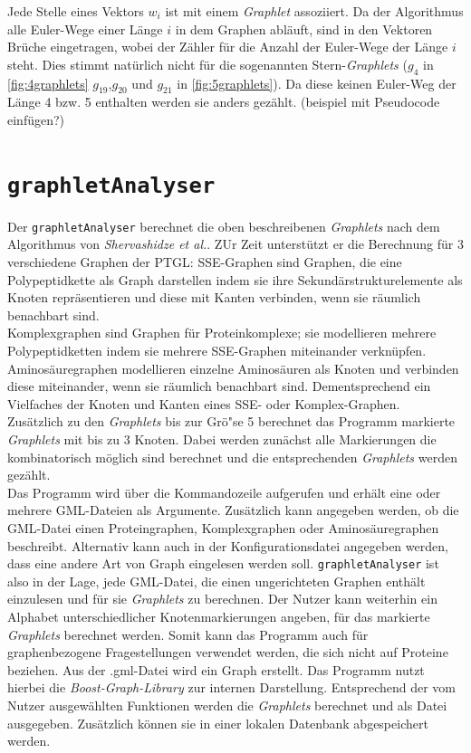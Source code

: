 \documentclass{report}
\begin{document}
Jede Stelle eines Vektors $w_i$ ist mit einem \textit{Graphlet} assoziiert. Da der Algorithmus alle Euler-Wege einer L\"ange $i$ in dem Graphen abl\"auft, sind in den Vektoren Br\"uche eingetragen, wobei der Z\"ahler f\"ur die Anzahl der Euler-Wege der L\"ange $i$ steht. Dies stimmt nat\"urlich nicht f\"ur die sogenannten Stern-\textit{Graphlets} ($g_4$ in \ref{fig:4graphlets} $g_{19}$,$g_{20}$ und $g_{21}$ in \ref{fig:5graphlets}). Da diese keinen Euler-Weg der L\"ange 4 bzw. 5 enthalten werden sie anders gez\"ahlt.
(beispiel mit Pseudocode einf\"ugen?)


\section{\texttt{graphletAnalyser}}

Der \texttt{graphletAnalyser} berechnet die oben beschreibenen \textit{Graphlets} nach dem Algorithmus von \emph{Shervashidze et al.}. ZUr Zeit unterst\"utzt er die Berechnung f\"ur 3 verschiedene Graphen der PTGL: 
SSE-Graphen sind Graphen, die eine Polypeptidkette als Graph darstellen indem sie ihre Sekund\"arstrukturelemente als Knoten repr\"asentieren und diese mit Kanten verbinden, wenn sie r\"aumlich benachbart sind. \\
Komplexgraphen sind Graphen f\"ur Proteinkomplexe; sie modellieren mehrere Polypeptidketten indem sie mehrere SSE-Graphen miteinander verkn\"upfen. \\
Aminos\"auregraphen modellieren einzelne Aminos\"auren als Knoten und verbinden diese miteinander, wenn sie r\"aumlich benachbart sind. Dementsprechend ein Vielfaches der Knoten und Kanten eines SSE- oder Komplex-Graphen. \\
Zus\"atzlich zu den \textit{Graphlets} bis zur Gr\"o"se 5 berechnet das Programm markierte \textit{Graphlets} mit bis zu 3 Knoten. Dabei werden zun\"achst alle Markierungen die kombinatorisch m\"oglich sind berechnet und die entsprechenden \textit{Graphlets} werden gez\"ahlt.\\
Das Programm wird \"uber die Kommandozeile aufgerufen und erh\"alt eine oder mehrere GML-Dateien als Argumente.
Zus\"atzlich kann angegeben werden, ob die GML-Datei einen Proteingraphen, Komplexgraphen oder Aminos\"auregraphen beschreibt.
Alternativ kann auch in der Konfigurationsdatei angegeben werden, dass eine andere Art von Graph eingelesen werden soll.
\texttt{graphletAnalyser} ist also in der Lage, jede GML-Datei, die einen ungerichteten Graphen enth\"alt einzulesen und f\"ur sie \textit{Graphlets} zu berechnen. Der Nutzer kann weiterhin ein Alphabet unterschiedlicher Knotenmarkierungen angeben, f\"ur das markierte \textit{Graphlets} berechnet werden. Somit kann das Programm auch f\"ur graphenbezogene Fragestellungen verwendet werden, die sich nicht auf Proteine beziehen.
Aus der .gml-Datei wird ein Graph erstellt. Das Programm nutzt hierbei die \textit{Boost-Graph-Library} zur internen Darstellung. Entsprechend der vom Nutzer ausgew\"ahlten Funktionen werden die \textit{Graphlets} berechnet und als Datei ausgegeben. Zus\"atzlich k\"onnen sie in einer lokalen Datenbank abgespeichert werden.
\end{document}
